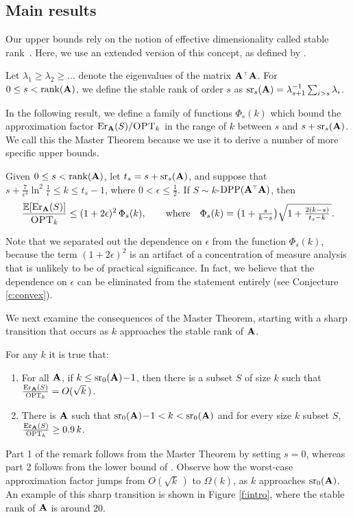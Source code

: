 \documentclass{article}
\begin{document}
\subsection{Main results}
Our upper bounds rely on the notion of effective dimensionality called
stable rank~\citep{ridge-leverage-scores}. Here, we use an extended version of this concept, as
defined by \citet{BLLT19_TR}.
\begin{definition}
Let $\lambda_1\geq \lambda_2\geq ...$ denote the eigenvalues of the
matrix $\A^\top\A$. For  $0\leq s<\mathrm{rank}(\mathbf A)$, we define the stable
rank of order $s$ as ${\mathrm{sr}}_s(\mathbf A) = \lambda_{s+1}^{-1}\sum_{i>s}\lambda_i$.
\end{definition}
In the following result, we define a family of functions $\Phi_s(k)$ which
bound the approximation factor $\mathrm{Er}_\mathbf A(S)/{\textsc{OPT}_k}$ in the range of $k$ between $s$ and
$s+{\mathrm{sr}}_s(\mathbf A)$. We call this the Master Theorem because we use it to derive
a number of more specific upper bounds.
\begin{theorem}\label{t:upper}
Given $0\leq s<\mathrm{rank}(\mathbf A) $, let  $t_s = s+{\mathrm{sr}}_s(\mathbf A)$,
and suppose that $s+ \frac7{\epsilon^4}\ln^2\!\frac1\epsilon \leq k\leq t_s-1$,
where $0<\epsilon\leq\frac12$. If $S\sim k$-$\DPP(\A^\top\A)$, then
\begin{align*}
  \frac{\mathbb E[\mathrm{Er}_\mathbf A(S)]}{{\textsc{OPT}_k}}\leq (1+2\epsilon)^2\,\Phi_{s}(k),
  \qquad\text{where}\quad \Phi_s(k)=\big(1+\tfrac{s}{k-s}\big)\sqrt{1 + \tfrac{2(k-s)}{t_s-k}\,}.
\end{align*}
\end{theorem}
Note that we separated out the dependence on $\epsilon$ from the function
$\Phi_s(k)$, because the term $(1+2\epsilon)^2$ is an artifact of a
concentration of measure analysis that is unlikely to be of practical
significance. In fact, we believe that the dependence on $\epsilon$
can be eliminated from the statement entirely (see
Conjecture \ref{c:convex}). 

We next examine the consequences of
the Master Theorem, starting with a sharp transition that occurs as $k$
approaches the stable rank of $\mathbf A$. 
\begin{remark}\label{r:phase-transition}
For any $k$ it is true that:
  \begin{enumerate}
\item  For all $\mathbf A$, if $k\leq {\mathrm{sr}}_0(\mathbf A)\!-\!1$, then there is a subset $S$ of size $k$ such that
$\frac{\mathrm{Er}_\mathbf A(S)}{{\textsc{OPT}_k}} = O(\sqrt  k\,)$.
\item There is $\mathbf A$ such that ${\mathrm{sr}}_0(\mathbf A)\!-\!1<k<{\mathrm{sr}}_0(\mathbf A)$ and for
  every size $k$ subset $S$, $\frac{\mathrm{Er}_\mathbf A(S)}{{\textsc{OPT}_k}}
  \geq 0.9\,k$.
  \end{enumerate}
\end{remark}
Part 1 of the remark follows from the Master Theorem by setting
$s=0$, whereas part 2 follows from the lower bound of
\citet{more-efficient-volume-sampling}. Observe how the worst-case
approximation factor jumps from $O(\sqrt k\,)$ to $\Omega(k)$, as $k$
approaches ${\mathrm{sr}}_0(\mathbf A)$. An example of this sharp
transition is shown in Figure \ref{f:intro}, where the stable
rank of $\mathbf A$ is around $20$. 
\end{document}
